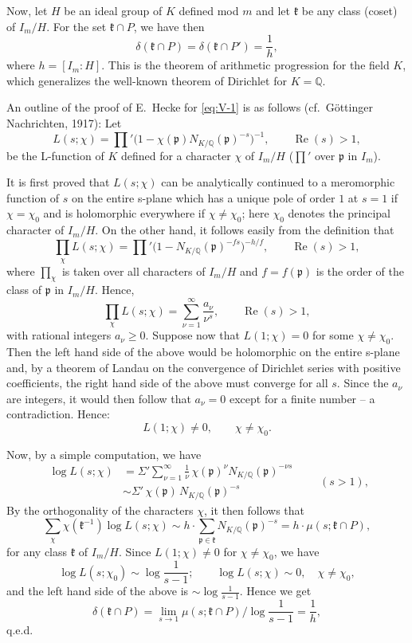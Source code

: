 Now, let $H$ be an ideal group of $K$ defined mod $m$ and let
$\mathfrak{k}$ be any class (coset) of $I_{m}/H$. For the set
$\mathfrak{k}\cap P$, we have then
\[
\delta(\mathfrak{k}\cap P)=\delta(\mathfrak{k}\cap P')
=\frac{1}{h},
\tag{1}\label{eq:V-1}
\]
where $h=[I_{m}:H]$. This is the theorem of arithmetic progression for
the field $K$, which generalizes the well-known theorem of Dirichlet for
$K=\mathbb{Q}$.

An outline of the proof of E.~Hecke for \eqref{eq:V-1} is as follows
(cf.\ G\"ottinger Nachrichten, 1917): Let
\[
L(s;\chi)=\prod'\bigl(1-\chi(\mathfrak{p})
N_{K/\mathbb{Q}}(\mathfrak{p})^{-s}\bigr)^{-1},
\qquad\operatorname{Re}(s)>1,
\]
be the L-function of $K$ defined for a character $\chi$ of $I_{m}/H$
($\prod'$ over $\mathfrak{p}$ in $I_{m}$).

It is first proved that $L(s;\chi)$ can be analytically continued to a
meromorphic function of $s$ on the entire s-plane which has a unique pole
of order $1$ at $s=1$ if $\chi=\chi_{0}$ and is holomorphic everywhere if
$\chi\neq\chi_{0}$; here $\chi_{0}$ denotes the principal character of
$I_{m}/H$. On the other hand, it follows easily from the definition that
\[
\prod_{\chi}L(s;\chi)
=\prod'\bigl(1-N_{K/\mathbb{Q}}(\mathfrak{p})^{-fs}\bigr)^{-h/f},
\qquad\operatorname{Re}(s)>1,
\]
where $\prod_{\chi}$ is taken over all characters of $I_{m}/H$ and
$f=f(\mathfrak{p})$ is the order of the class of $\mathfrak{p}$ in
$I_{m}/H$. Hence,
\[
\prod_{\chi}L(s;\chi)=\sum_{\nu=1}^{\infty}\frac{a_{\nu}}{\nu^{s}},
\qquad\operatorname{Re}(s)>1,
\]
with rational integers $a_{\nu}\geq 0$. Suppose now that $L(1;\chi)=0$
for some $\chi\neq\chi_{0}$. Then the left hand side of the above would
be holomorphic on the entire s-plane and, by a theorem of Landau on the
convergence of Dirichlet series with positive coefficients, the right
hand side of the above must converge for all $s$. Since the $a_{\nu}$ are
integers, it would then follow that $a_{\nu}=0$ except for a finite
number -- a contradiction. Hence:
\[
L(1;\chi)\neq 0,\qquad\chi\neq\chi_{0}.
\]

Now, by a simple computation, we have
\[
\begin{aligned}
\log L(s;\chi)
&=\Sigma'\sum_{\nu=1}^{\infty}\frac{1}{\nu}\,
\chi(\mathfrak{p})^{\nu}N_{K/\mathbb{Q}}(\mathfrak{p})^{-\nu s}\\
&\sim\Sigma'\,\chi(\mathfrak{p})\,N_{K/\mathbb{Q}}(\mathfrak{p})^{-s}
\end{aligned}
\qquad(s>1),
\]
By the orthogonality of the characters $\chi$, it then follows that
\[
\sum_{\chi}\chi(\mathfrak{k}^{-1})\log L(s;\chi)
\sim h\cdot\sum_{\mathfrak{p}\in\mathfrak{k}}
N_{K/\mathbb{Q}}(\mathfrak{p})^{-s}
=h\cdot\mu(s;\mathfrak{k}\cap P),
\]
for any class $\mathfrak{k}$ of $I_{m}/H$. Since $L(1;\chi)\neq 0$ for
$\chi\neq\chi_{0}$, we have
\[
\log L(s;\chi_{0})\sim\log\frac{1}{s-1};\qquad
\log L(s;\chi)\sim 0,\quad\chi\neq\chi_{0},
\]
and the left hand side of the above is $\sim\log\frac{1}{s-1}$. Hence we
get
\[
\delta(\mathfrak{k}\cap P)=\lim_{s\to 1}
\mu(s;\mathfrak{k}\cap P)\big/\log\frac{1}{s-1}=\frac{1}{h},
\]
q.e.d.

